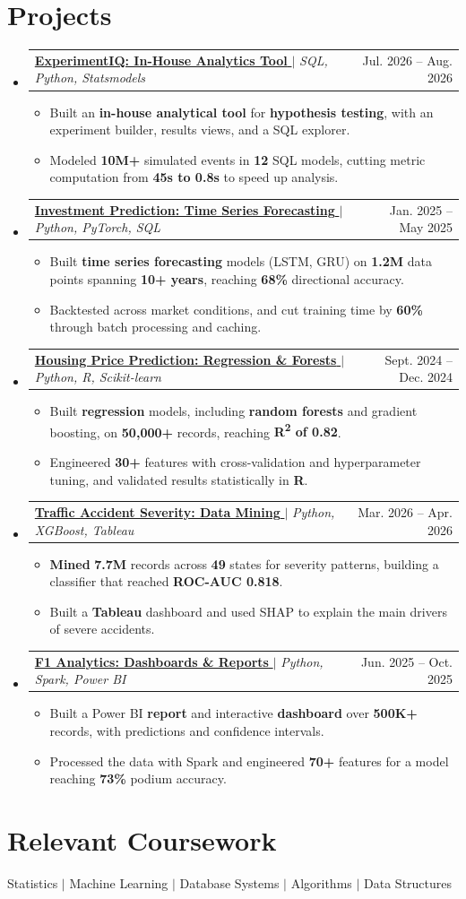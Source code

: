 \documentclass[letterpaper,10.5pt]{article}
\makeatletter
\newcommand{\resumeItem}[1]{\item\small{{#1 \vspace{-2pt}}}}
\newcommand{\resumeProjectHeading}[2]{\vspace{-3pt}\item\begin{tabular*}{0.97\textwidth}{l@{\extracolsep{\fill}}r}\small#1 & \small #2 \\\end{tabular*}\vspace{-5pt}}
\newcommand{\resumeSubHeadingListStart}{\begin{itemize}[leftmargin=0.15in, label={}]}
\newcommand{\resumeSubHeadingListEnd}{\end{itemize}}
\newcommand{\resumeItemListStart}{\begin{itemize}}
\newcommand{\resumeItemListEnd}{\end{itemize}\vspace{-5pt}}
\makeatother
\begin{document}
\section{Projects}
\resumeSubHeadingListStart
\resumeProjectHeading{\href{https://github.com/vatsalp2008/ExperimentIQ}{\textbf{ExperimentIQ: In-House Analytics Tool} \faIcon{external-link-alt}} $|$ \emph{SQL, Python, Statsmodels}}{Jul. 2026 -- Aug. 2026}
\resumeItemListStart
\resumeItem{Built an \textbf{in-house analytical tool} for \textbf{hypothesis testing}, with an experiment builder, results views, and a SQL explorer.}
\resumeItem{Modeled \textbf{10M+} simulated events in \textbf{12} SQL models, cutting metric computation from \textbf{45s to 0.8s} to speed up analysis.}
\resumeItemListEnd
\resumeProjectHeading{\href{https://github.com/vatsalp2008/Investment-Prediction}{\textbf{Investment Prediction: Time Series Forecasting} \faIcon{external-link-alt}} $|$ \emph{Python, PyTorch, SQL}}{Jan. 2025 -- May 2025}
\resumeItemListStart
\resumeItem{Built \textbf{time series forecasting} models (LSTM, GRU) on \textbf{1.2M} data points spanning \textbf{10+ years}, reaching \textbf{68\%} directional accuracy.}
\resumeItem{Backtested across market conditions, and cut training time by \textbf{60\%} through batch processing and caching.}
\resumeItemListEnd
\resumeProjectHeading{\href{https://github.com/vatsalp2008/Housing-Price-Prediction}{\textbf{Housing Price Prediction: Regression \& Forests} \faIcon{external-link-alt}} $|$ \emph{Python, R, Scikit-learn}}{Sept. 2024 -- Dec. 2024}
\resumeItemListStart
\resumeItem{Built \textbf{regression} models, including \textbf{random forests} and gradient boosting, on \textbf{50,000+} records, reaching \textbf{R\textsuperscript{2} of 0.82}.}
\resumeItem{Engineered \textbf{30+} features with cross-validation and hyperparameter tuning, and validated results statistically in \textbf{R}.}
\resumeItemListEnd
\resumeProjectHeading{\href{https://github.com/vatsalp2008/Accidents-Severity}{\textbf{Traffic Accident Severity: Data Mining} \faIcon{external-link-alt}} $|$ \emph{Python, XGBoost, Tableau}}{Mar. 2026 -- Apr. 2026}
\resumeItemListStart
\resumeItem{\textbf{Mined} \textbf{7.7M} records across \textbf{49} states for severity patterns, building a classifier that reached \textbf{ROC-AUC 0.818}.}
\resumeItem{Built a \textbf{Tableau} dashboard and used SHAP to explain the main drivers of severe accidents.}
\resumeItemListEnd
\resumeProjectHeading{\href{https://github.com/vatsalp2008/f1-analytics-dashboard}{\textbf{F1 Analytics: Dashboards \& Reports} \faIcon{external-link-alt}} $|$ \emph{Python, Spark, Power BI}}{Jun. 2025 -- Oct. 2025}
\resumeItemListStart
\resumeItem{Built a Power BI \textbf{report} and interactive \textbf{dashboard} over \textbf{500K+} records, with predictions and confidence intervals.}
\resumeItem{Processed the data with Spark and engineered \textbf{70+} features for a model reaching \textbf{73\%} podium accuracy.}
\resumeItemListEnd
\resumeSubHeadingListEnd
\section{Relevant Coursework}
\begin{itemize}[leftmargin=0.15in, label={}]
\small{\item{Statistics $|$ Machine Learning $|$ Database Systems $|$ Algorithms $|$ Data Structures}}
\end{itemize}\vspace{-10pt}
\end{document}
